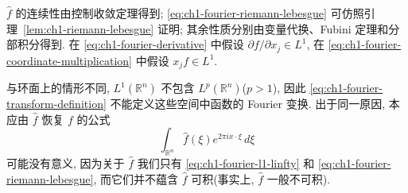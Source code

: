 $\widehat f$ 的连续性由控制收敛定理得到; \eqref{eq:ch1-fourier-riemann-lebesgue} 可仿照引理~\ref{lem:ch1-riemann-lebesgue} 证明; 其余性质分别由变量代换、Fubini 定理和分部积分得到. 在 \eqref{eq:ch1-fourier-derivative} 中假设 $\partial f/\partial x_j\in L^1$, 在 \eqref{eq:ch1-fourier-coordinate-multiplication} 中假设 $x_jf\in L^1$.

与环面上的情形不同, $L^1(\mathbb R^n)$ 不包含 $L^p(\mathbb R^n)$($p>1$), 因此 \eqref{eq:ch1-fourier-transform-definition} 不能定义这些空间中函数的 Fourier 变换. 出于同一原因, 本应由 $\widehat f$ 恢复 $f$ 的公式
\[
 \int_{\mathbb R^n}\widehat f(\xi)e^{2\pi ix\cdot\xi}\,d\xi
\]
可能没有意义, 因为关于 $\widehat f$ 我们只有 \eqref{eq:ch1-fourier-l1-linfty} 和 \eqref{eq:ch1-fourier-riemann-lebesgue}, 而它们并不蕴含 $\widehat f$ 可积(事实上, $\widehat f$ 一般不可积).


